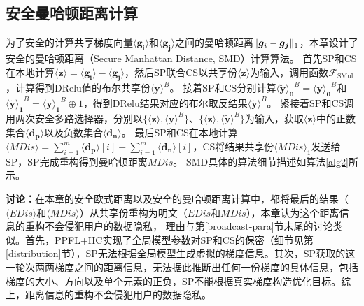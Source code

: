 \subsection{安全曼哈顿距离计算}\label{smd}
为了安全的计算共享梯度向量$\boldsymbol{\langle g_i\rangle}$和$\boldsymbol{\langle g_j\rangle}$之间的曼哈顿距离$\Vert \boldsymbol{g_i} - \boldsymbol{g_j}\Vert_1$，本章设计了安全的曼哈顿距离（Secure Manhattan Distance, SMD）计算算法。
首先SP和CS在本地计算$\boldsymbol{\langle z\rangle} = \boldsymbol{\langle g_i\rangle} - \boldsymbol{\langle g_j\rangle}$，然后SP联合CS以共享份$\boldsymbol{\langle z\rangle}$为输入，调用函数$\mathcal{F}_{\text {SMul}}$，计算得到DRelu值的布尔共享份$\boldsymbol{\langle y\rangle}^{B}$。
接着SP和CS分别计算$\boldsymbol{\langle \widetilde{y} \rangle_0}^{B} = \boldsymbol{\langle y\rangle_0}^{B}$和$\boldsymbol{\langle \widetilde{y} \rangle_1}^{B} = \boldsymbol{\langle y\rangle_1}^{B} \oplus 1$，得到DRelu结果对应的布尔取反结果$\boldsymbol{\langle \widetilde{y} \rangle}^{B}$。
紧接着SP和CS调用两次安全多路选择器，分别以$\{\boldsymbol{\langle z\rangle}, \boldsymbol{\langle y\rangle}^{B}\}$、$\{\boldsymbol{\langle z\rangle}, \boldsymbol{\langle \widetilde{y}\rangle}^{B}\}$为输入，获取$\boldsymbol{\langle z\rangle}$中的正数集合$\boldsymbol{
	\langle d_p\rangle}$以及负数集合$\boldsymbol{
	\langle d_n\rangle}$。
最后SP和CS在本地计算$\langle \textit{MDis}\rangle = \sum_{i=1}^{m}\boldsymbol{\langle d_p\rangle}[i] - \sum_{i=1}^{m}\boldsymbol{\langle d_n\rangle}[i]$，CS将结果共享份$\langle \textit{MDis}\rangle_1$发送给SP，SP完成重构得到曼哈顿距离$\textit{MDis}$。
SMD具体的算法细节描述如算法\ref{alg2}所示。

\textbf{讨论：}在本章的安全欧式距离以及安全的曼哈顿距离计算中，都将最后的结果（$\langle \textit{EDis}\rangle$和$\langle \textit{MDis}\rangle$）从共享份重构为明文（$\textit{EDis}$和$\textit{MDis}$），本章认为这个距离信息的重构不会侵犯用户的数据隐私，
理由与第\ref{broadcast-para}节末尾的讨论类似。首先，PPFL+HC实现了全局模型参数对SP和CS的保密（细节见第\ref{distribution}节），SP无法根据全局模型生成虚拟的梯度信息。其次，SP获取的这一轮次两两梯度之间的距离信息，无法据此推断出任何一份梯度的具体信息，包括梯度的大小、方向以及单个元素的正负，SP不能根据真实梯度构造优化目标。综上，距离信息的重构不会侵犯用户的数据隐私。

